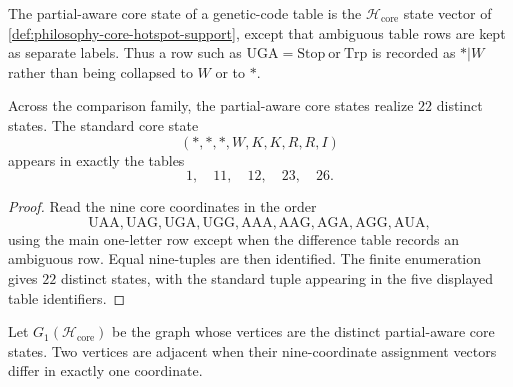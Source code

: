 \begin{definition}
\label{def:philosophy-partial-aware-core-state}
The partial-aware core state of a genetic-code table is the
$\mathcal H_{\mathrm{core}}$ state vector of
\autoref{def:philosophy-core-hotspot-support}, except that ambiguous
table rows are kept as separate labels. Thus a row such as
$\mathrm{UGA}=\mathrm{Stop}\ \text{or}\ \mathrm{Trp}$ is recorded as
$*|W$ rather than being collapsed to $W$ or to $*$.
\end{definition}

\begin{theorem}
\label{thm:philosophy-partial-aware-core-state-spectrum}
Across the comparison family, the partial-aware core states realize
$22$ distinct states. The standard core state
$$
  (*,*,*,W,K,K,R,R,I)
$$
appears in exactly the tables
$$
  1,\quad 11,\quad 12,\quad 23,\quad 26.
$$
\end{theorem}
\begin{proof}
Read the nine core coordinates in the order
$$
  \mathrm{UAA},\mathrm{UAG},\mathrm{UGA},\mathrm{UGG},
  \mathrm{AAA},\mathrm{AAG},\mathrm{AGA},\mathrm{AGG},\mathrm{AUA},
$$
using the main one-letter row except when the difference table records
an ambiguous row. Equal nine-tuples are then identified. The finite
enumeration gives $22$ distinct states, with the standard tuple appearing
in the five displayed table identifiers.
\end{proof}

\begin{definition}
\label{def:philosophy-strict-core-state-graph}
Let $G_{1}(\mathcal H_{\mathrm{core}})$ be the graph whose vertices are
the distinct partial-aware core states. Two vertices are adjacent when
their nine-coordinate assignment vectors differ in exactly one
coordinate.
\end{definition}

